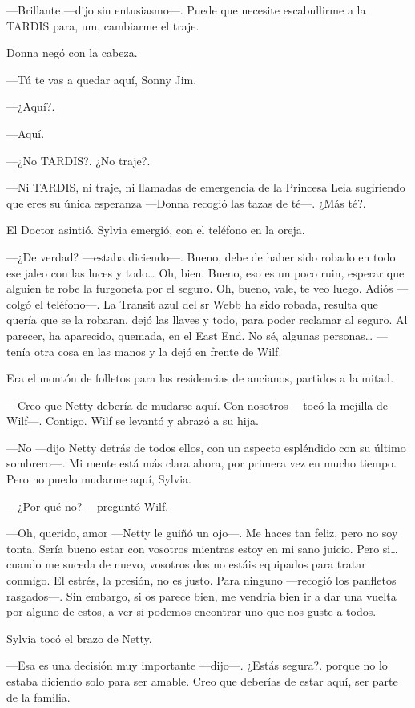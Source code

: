 ---Brillante ---dijo sin entusiasmo---. Puede que necesite escabullirme
a la TARDIS para, um, cambiarme el traje.

Donna negó con la cabeza.

---Tú te vas a quedar aquí, Sonny Jim.

---¿Aquí?.

---Aquí.

---¿No TARDIS?. ¿No traje?.

---Ni TARDIS, ni traje, ni llamadas de emergencia de la Princesa Leia
sugiriendo que eres su única esperanza ---Donna recogió las tazas de
té---. ¿Más té?.

El Doctor asintió. Sylvia emergió, con el teléfono en la oreja.

---¿De verdad? ---estaba diciendo---. Bueno, debe de haber sido robado
en todo ese jaleo con las luces y todo\ldots{} Oh, bien. Bueno, eso es
un poco ruin, esperar que alguien te robe la furgoneta por el seguro.
Oh, bueno, vale, te veo luego. Adiós ---colgó el teléfono---. La Transit
azul del sr Webb ha sido robada, resulta que quería que se la robaran,
dejó las llaves y todo, para poder reclamar al seguro. Al parecer, ha
aparecido, quemada, en el East End. No sé, algunas personas\ldots{}
---tenía otra cosa en las manos y la dejó en frente de Wilf.

Era el montón de folletos para las residencias de ancianos, partidos a
la mitad.

---Creo que Netty debería de mudarse aquí. Con nosotros ---tocó la
mejilla de Wilf---. Contigo. Wilf se levantó y abrazó a su hija.

---No ---dijo Netty detrás de todos ellos, con un aspecto espléndido con
su último sombrero---. Mi mente está más clara ahora, por primera vez en
mucho tiempo. Pero no puedo mudarme aquí, Sylvia.

---¿Por qué no? ---preguntó Wilf.

---Oh, querido, amor ---Netty le guiñó un ojo---. Me haces tan feliz,
pero no soy tonta. Sería bueno estar con vosotros mientras estoy en mi
sano juicio. Pero si\ldots{} cuando me suceda de nuevo, vosotros dos no
estáis equipados para tratar conmigo. El estrés, la presión, no es
justo. Para ninguno ---recogió los panfletos rasgados---. Sin embargo,
si os parece bien, me vendría bien ir a dar una vuelta por alguno de
estos, a ver si podemos encontrar uno que nos guste a todos.

Sylvia tocó el brazo de Netty.

---Esa es una decisión muy importante ---dijo---. ¿Estás segura?. porque
no lo estaba diciendo solo para ser amable. Creo que deberías de estar
aquí, ser parte de la familia.

